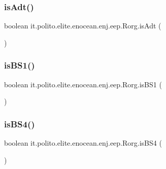 \subsubsection{\texorpdfstring{is\+Adt()}{isAdt()}}
{\footnotesize\ttfamily boolean it.\+polito.\+elite.\+enocean.\+enj.\+eep.\+Rorg.\+is\+Adt (\begin{DoxyParamCaption}{ }\end{DoxyParamCaption})}

\hypertarget{classit_1_1polito_1_1elite_1_1enocean_1_1enj_1_1eep_1_1_rorg_a077d79ae2a02ae64bb396a178cc38ce5}{}\label{classit_1_1polito_1_1elite_1_1enocean_1_1enj_1_1eep_1_1_rorg_a077d79ae2a02ae64bb396a178cc38ce5} 
\subsubsection{\texorpdfstring{is\+B\+S1()}{isBS1()}}
{\footnotesize\ttfamily boolean it.\+polito.\+elite.\+enocean.\+enj.\+eep.\+Rorg.\+is\+B\+S1 (\begin{DoxyParamCaption}{ }\end{DoxyParamCaption})}

\hypertarget{classit_1_1polito_1_1elite_1_1enocean_1_1enj_1_1eep_1_1_rorg_aff92464b1d6b605738c852b74abc4e44}{}\label{classit_1_1polito_1_1elite_1_1enocean_1_1enj_1_1eep_1_1_rorg_aff92464b1d6b605738c852b74abc4e44} 
\subsubsection{\texorpdfstring{is\+B\+S4()}{isBS4()}}
{\footnotesize\ttfamily boolean it.\+polito.\+elite.\+enocean.\+enj.\+eep.\+Rorg.\+is\+B\+S4 (\begin{DoxyParamCaption}{ }\end{DoxyParamCaption})}

\hypertarget{classit_1_1polito_1_1elite_1_1enocean_1_1enj_1_1eep_1_1_rorg_a544e7b60900c0dc8d3715232db3e211a}{}\label{classit_1_1polito_1_1elite_1_1enocean_1_1enj_1_1eep_1_1_rorg_a544e7b60900c0dc8d3715232db3e211a} 
